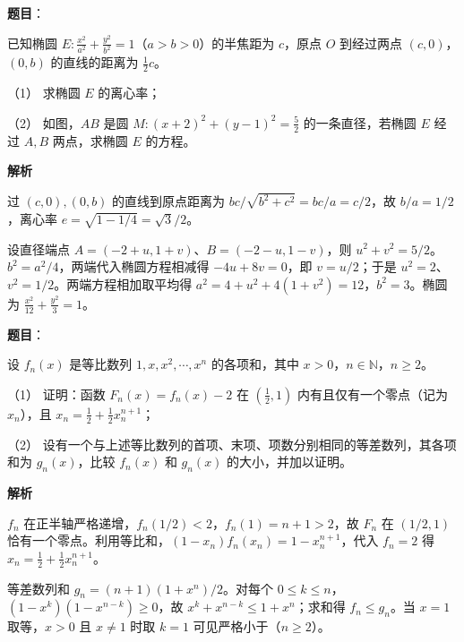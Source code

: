 \begin{answer}

\textbf{题目}：

已知椭圆 $E:\frac{x^2}{a^2}+\frac{y^2}{b^2}=1$（$a>b>0$）的半焦距为 $c$，原点 $O$ 到经过两点 $(c,0)$，$(0,b)$ 的直线的距离为 $\frac12c$。

（1） 求椭圆 $E$ 的离心率；

（2） 如图，$AB$ 是圆 $M:(x+2)^2+(y-1)^2=\frac52$ 的一条直径，若椭圆 $E$ 经过 $A,B$ 两点，求椭圆 $E$ 的方程。
\nopagebreak[4]
\begin{center}\end{center}
\nopagebreak[4]
\textbf{解析}


过 $(c,0),(0,b)$ 的直线到原点距离为 $bc/\sqrt{b^2+c^2}=bc/a=c/2$，故 $b/a=1/2$，离心率 $e=\sqrt{1-1/4}=\sqrt3/2$。


设直径端点 $A=(-2+u,1+v)$、$B=(-2-u,1-v)$，则 $u^2+v^2=5/2$。$b^2=a^2/4$，两端代入椭圆方程相减得 $-4u+8v=0$，即 $v=u/2$；于是 $u^2=2$、$v^2=1/2$。两端方程相加取平均得 $a^2=4+u^2+4(1+v^2)=12$，$b^2=3$。椭圆为 $\frac{x^2}{12}+\frac{y^2}{3}=1$。



\end{answer}
\begin{answer}

\textbf{题目}：

设 $f_n(x)$ 是等比数列 $1,x,x^2,\cdots,x^n$ 的各项和，其中 $x>0$，$n\in\mathbb N$，$n\geq2$。

（1） 证明：函数 $F_n(x)=f_n(x)-2$ 在 $(\frac12,1)$ 内有且仅有一个零点（记为 $x_n$），且 $x_n=\frac12+\frac12x_n^{n+1}$；

（2） 设有一个与上述等比数列的首项、末项、项数分别相同的等差数列，其各项和为 $g_n(x)$，比较 $f_n(x)$ 和 $g_n(x)$ 的大小，并加以证明。

\textbf{解析}


$f_n$ 在正半轴严格递增，$f_n(1/2)<2$，$f_n(1)=n+1>2$，故 $F_n$ 在 $(1/2,1)$ 恰有一个零点。利用等比和，$(1-x_n)f_n(x_n)=1-x_n^{n+1}$，代入 $f_n=2$ 得 $x_n=\frac12+\frac12x_n^{n+1}$。


等差数列和 $g_n=(n+1)(1+x^n)/2$。对每个 $0\le k\le n$，$(1-x^k)(1-x^{n-k})\ge0$，故 $x^k+x^{n-k}\le1+x^n$；求和得 $f_n\le g_n$。当 $x=1$ 取等，$x>0$ 且 $x\ne1$ 时取 $k=1$ 可见严格小于（$n\ge2$）。



\end{answer}
